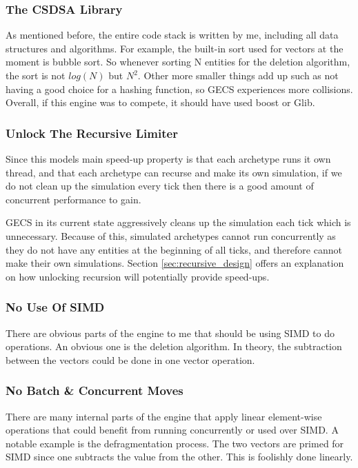 \subsubsection{The CSDSA Library}
As mentioned before, the entire code stack is written by me, including all data structures and algorithms. For example, the built-in sort used for vectors at the moment is bubble sort. So whenever sorting N entities for the deletion algorithm, the sort is not $log(N)$ but $N^2$. Other more smaller things add up such as not having a good choice for a hashing function, so GECS experiences more collisions. Overall, if this engine was to compete, it should have used boost or Glib. 

\subsubsection{Unlock The Recursive Limiter}
Since this models main speed-up property is that each archetype runs it own thread, and that each archetype can recurse and make its own simulation, if we do not clean up the simulation every tick then there is a good amount of concurrent performance to gain.

GECS in its current state aggressively cleans up the simulation each tick which is unnecessary. Because of this, simulated archetypes cannot run concurrently as they do not have any entities at the beginning of all ticks, and therefore cannot make their own simulations. Section \ref{sec:recursive_design} offers an explanation on how unlocking recursion will potentially provide speed-ups.

\subsubsection{No Use Of SIMD}
There are obvious parts of the engine to me that should be using SIMD to do operations. An obvious one is the deletion algorithm. In theory, the subtraction between the vectors could be done in one vector operation.

\subsubsection{No Batch \& Concurrent Moves}
There are many internal parts of the engine that apply linear element-wise operations that could benefit from running concurrently or used over SIMD. A notable example is the defragmentation process. The two vectors are primed for SIMD since one subtracts the value from the other. This is foolishly done linearly.

